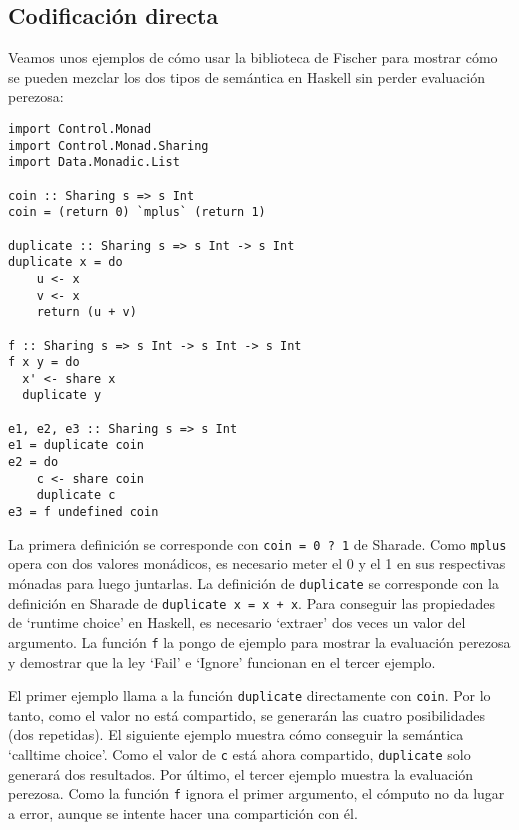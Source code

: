 \documentclass[class=article, crop=false]{standalone}
\begin{document}
\subsection{Codificación directa}\label{sec:uso_directo}
Veamos unos ejemplos de cómo usar la biblioteca de Fischer para mostrar cómo se pueden
mezclar los dos tipos de semántica en Haskell sin perder evaluación perezosa:

\begin{verbatim}
import Control.Monad
import Control.Monad.Sharing
import Data.Monadic.List

coin :: Sharing s => s Int
coin = (return 0) `mplus` (return 1)

duplicate :: Sharing s => s Int -> s Int
duplicate x = do
    u <- x
    v <- x
    return (u + v)

f :: Sharing s => s Int -> s Int -> s Int
f x y = do
  x' <- share x
  duplicate y

e1, e2, e3 :: Sharing s => s Int
e1 = duplicate coin
e2 = do
    c <- share coin
    duplicate c
e3 = f undefined coin  
\end{verbatim}

La primera definición se corresponde con \verb`coin = 0 ? 1` de Sharade. Como \verb`mplus`
opera con dos valores monádicos, es necesario meter el 0 y el 1 en sus respectivas mónadas
para luego juntarlas. La definición de \verb`duplicate` se corresponde con la definición en
Sharade de \verb`duplicate x = x + x`. Para conseguir las propiedades de `runtime choice' en
Haskell, es necesario `extraer' dos veces un valor del argumento. La función \verb`f` la
pongo de ejemplo para mostrar la evaluación perezosa y demostrar que la ley `Fail' e `Ignore'
funcionan en el tercer ejemplo.

El primer ejemplo llama a la función \verb`duplicate` directamente con \verb`coin`. Por lo
tanto, como el valor no está compartido, se generarán las cuatro posibilidades (dos
repetidas). El siguiente ejemplo muestra cómo conseguir la semántica `calltime choice'. Como
el valor de \verb`c` está ahora compartido, \verb`duplicate` solo generará dos resultados.
Por último, el tercer ejemplo muestra la evaluación perezosa. Como la función \verb`f` ignora
el primer argumento, el cómputo no da lugar a error, aunque se intente hacer una compartición
con él.
\end{document}
